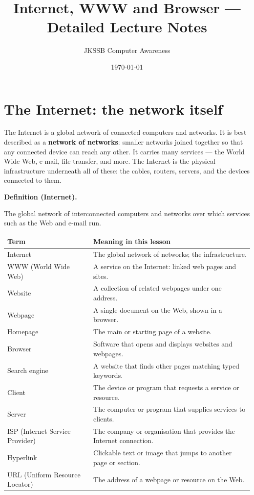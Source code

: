 \documentclass[11pt]{article}
\title{Internet, WWW and Browser --- Detailed Lecture Notes}
\author{JKSSB Computer Awareness}
\date{\today}
\newenvironment{definitionbox}[1]{%
  \par\noindent\textbf{Definition (#1).}\ \itshape
}{\par\vspace{0.3em}}
\begin{document}
\maketitle

\section{The Internet: the network itself}
The Internet is a global network of connected computers and networks. It is
best described as a \textbf{network of networks}: smaller networks joined
together so that any connected device can reach any other. It carries many
services --- the World Wide Web, e-mail, file transfer, and more. The
Internet is the physical infrastructure underneath all of these: the cables,
routers, servers, and the devices connected to them.

\begin{definitionbox}{Internet}
The global network of interconnected computers and networks over which
services such as the Web and e-mail run.
\end{definitionbox}

\begin{center}
\begin{tabular}{p{}p{}}
\toprule
\textbf{Term} & \textbf{Meaning in this lesson} \\
\midrule
Internet & The global network of networks; the infrastructure. \\
WWW (World Wide Web) & A service on the Internet: linked web pages and sites. \\
Website & A collection of related webpages under one address. \\
Webpage & A single document on the Web, shown in a browser. \\
Homepage & The main or starting page of a website. \\
Browser & Software that opens and displays websites and webpages. \\
Search engine & A website that finds other pages matching typed keywords. \\
Client & The device or program that requests a service or resource. \\
Server & The computer or program that supplies services to clients. \\
ISP (Internet Service Provider) & The company or organisation that provides the Internet connection. \\
Hyperlink & Clickable text or image that jumps to another page or section. \\
URL (Uniform Resource Locator) & The address of a webpage or resource on the Web. \\
\bottomrule
\end{tabular}
\end{center}
\end{document}
